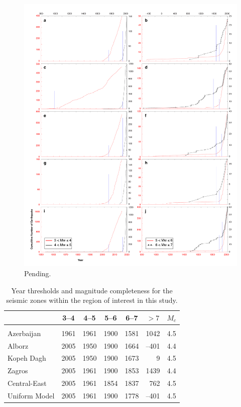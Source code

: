 \begin{figure}[t]
    \centering
    \includegraphics[scale=0.28]{figures/pdf/figure-05.pdf} 
    \caption{Pending.}
    \label{fig:completeness}
\end{figure}

\begin{table}[t]
    \centering
    \caption{Year thresholds and magnitude completeness for the seismic zones within the region of interest in this study.}
    \begin{tabular}{@{\hspace{0.2ex}}lccccrc@{\hspace{0.2ex}}}
        \cline{2-7}                                              \\[-1.6ex]
                        & 3--4 & 4--5 & 5--6 & 6--7 & 
                                  \multicolumn{1}{c}{$>7$} &$M_c$\\[0.6ex]
        \hline                                                   \\[-1.6ex]
        Azerbaijan      & 1961 & 1961 & 1900 & 1581 & 1042 & 4.5 \\
        Alborz          & 2005 & 1950 & 1900 & 1664 &--401 & 4.4 \\
        Kopeh Dagh      & 2005 & 1950 & 1900 & 1673 &    9 & 4.5 \\
        Zagros          & 2005 & 1961 & 1900 & 1853 & 1439 & 4.4 \\
        Central-East    & 2005 & 1961 & 1854 & 1837 &  762 & 4.5 \\
        Uniform Model   & 2005 & 1961 & 1900 & 1778 &--401 & 4.5 \\[0.5ex]
        \hline 
    \end{tabular}
    \label{tab:completeness} 
\end{table}

